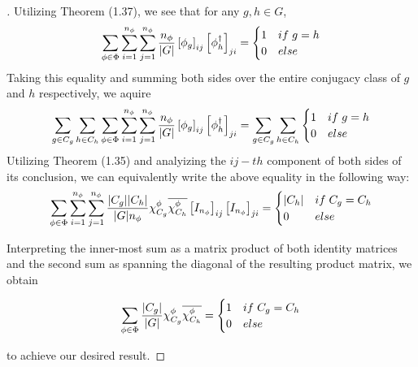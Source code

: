 \noindent \begin{proof}[\cite{Tung}] Utilizing Theorem (1.37), we see that for any $g, h \in G$, $$\sum_{\phi \in \Phi} \sum_{i=1}^{n_\phi} \sum_{j=1}^{n_\phi} \frac{n_\phi}{|G|} \left[\phi_g\right]_{ij}\left[\phi_{h}^\dag\right]_{ji} = \begin{cases}
																										1 & if \hspace{1mm} g = h \\
																										0 & else
																									\end{cases}$$
Taking this equality and summing both sides over the entire conjugacy class of $g$ and $h$ respectively, we aquire
\begin{equation}
	\begin{aligned}
		\sum_{g \in C_g} \sum_{h\in C_h} \sum_{\phi \in \Phi} \sum_{i=1}^{n_\phi} \sum_{j=1}^{n_\phi} \frac{n_\phi}{|G|} \left[\phi_g\right]_{ij}\left[\phi_{h}^\dag\right]_{ji} = \sum_{g \in C_g} \sum_{h\in C_h} \begin{cases}
																										1 & if \hspace{1mm} g = h \\
																										0 & else
																									\end{cases}
	\end{aligned}
\end{equation}
Utilizing Theorem (1.35) and analyizing the $ij-th$ component of both sides of its conclusion, we can equivalently write the above equality in the following way:
\begin{equation}
	\begin{aligned}
		 \sum_{\phi \in \Phi} \sum_{i=1}^{n_\phi} \sum_{j=1}^{n_\phi} \frac{|C_g||C_h|}{|G|n_\phi}\chi^\phi_{C_g}\overline{\chi^\phi_{C_h}} \left[I_{n_\phi}\right]_{ij}\left[I_{n_\phi}\right]_{ji} = \begin{cases}
																										|C_h| & if \hspace{1mm} C_g = C_h \\
																										0 & else
																									\end{cases}
	\end{aligned}
\end{equation}

Interpreting the inner-most sum as a matrix product of both identity matrices and the second sum as spanning the diagonal of the resulting product matrix, we obtain

\begin{equation}
	\begin{aligned}
		 \sum_{\phi \in \Phi} \frac{|C_g|}{|G|}\chi^\phi_{C_g}\overline{\chi^\phi_{C_h}} = \begin{cases}
																										1 & if \hspace{1mm} C_g = C_h \\
																										0 & else
																									\end{cases}
	\end{aligned}
\end{equation}

to achieve our desired result.  \end{proof}


